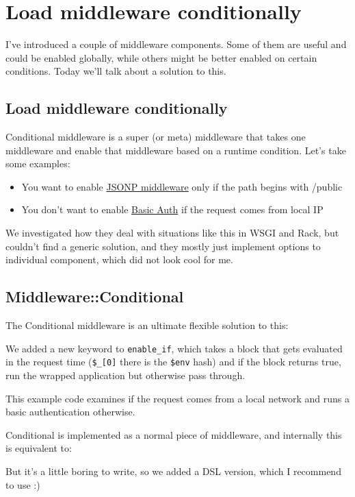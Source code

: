 \chapter{Load middleware conditionally}
\label{day-18-load-middleware-conditionally}

I've introduced a couple of middleware components. Some of them are
useful and could be enabled globally, while others might be better
enabled on certain conditions. Today we'll talk about a solution to
this.

\section{Load middleware
conditionally}\label{load-middleware-conditionally}

Conditional middleware is a super (or meta) middleware that takes one
middleware and enable that middleware based on a runtime condition.
Let's take some examples:

\begin{itemize}
\itemsep1pt\parskip0pt
\item
  You want to enable
  \href{http://advent.plackperl.org/2009/12/day-16-adding-jsonp-support-to-your-app.html}{JSONP
  middleware} only if the path begins with /public
\item
  You don't want to enable
  \href{http://advent.plackperl.org/2009/12/day-15-authenticate-your-app-with-middleware.html}{Basic
  Auth} if the request comes from local IP
\end{itemize}

We investigated how they deal with situations like this in WSGI and
Rack, but couldn't find a generic solution, and they mostly just
implement options to individual component, which did not look cool for
me.

\section{Middleware::Conditional}\label{middlewareconditional}

The Conditional middleware is an ultimate flexible solution to this:


We added a new keyword to  \lstinline!enable_if!, which
takes a block that gets evaluated in the request time (\lstinline!$_[0]!
there is the \lstinline!$env! hash) and if the block returns true, run
the wrapped application but otherwise pass through.

This example code examines if the request comes from a local network and
runs a basic authentication otherwise.

Conditional is implemented as a normal piece of middleware, and
internally this is equivalent to:


But it's a little boring to write, so we added a DSL version, which I
recommend to use :)

